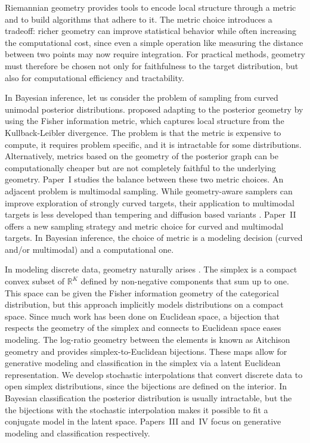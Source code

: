 Riemannian geometry \citep{do1992riemannian,Lee2018} provides tools to encode local structure through a metric and to build algorithms that adhere to it. The metric choice introduces a tradeoff: richer geometry can improve statistical behavior while often increasing the computational cost, since even a simple operation like measuring the distance between two points may now require integration. For practical methods, geometry must therefore be chosen not only for faithfulness to the target distribution, but also for computational efficiency and tractability. 

In Bayesian inference, let us consider the problem of sampling from curved unimodal posterior distributions. \citet{Girolami2011} proposed adapting to the posterior geometry by using the Fisher information metric, which captures local structure from the Kullback-Leibler divergence. The problem is that the metric is expensive to compute, it requires problem specific, and it is intractable for some distributions. Alternatively, metrics based on the geometry of the posterior graph \citep{Hartmann2022, hartmann:2023} can be computationally cheaper but are not completely faithful to the underlying geometry. Paper~I studies the balance between these two metric choices. An adjacent problem is multimodal sampling. While geometry-aware samplers can improve exploration of strongly curved targets, their application to multimodal targets is less developed than tempering and diffusion based variants \citep{Lan2014, Latuszynski2025}. Paper~II offers a new sampling strategy and metric choice for curved and multimodal targets. In Bayesian inference, the choice of metric is a modeling decision (curved and/or multimodal) and a computational one. 

In modeling discrete data, geometry naturally arises \citep{fisher1925theory, Aitchison1986}. The simplex is a compact convex subset of $\mathbb{R}^{K}$  defined by non-negative components that sum up to one. This space can be given the Fisher information geometry of the categorical distribution, but this approach implicitly models distributions on a compact space. Since much work has been done on Euclidean space, a bijection that respects the geometry of the simplex and connects to Euclidean space eases modeling. The log-ratio geometry between the elements is known as Aitchison geometry and provides simplex-to-Euclidean bijections. These maps allow for generative modeling and classification in the simplex via a latent Euclidean representation. We develop stochastic interpolations that convert discrete data to open simplex distributions, since the bijections are defined on the interior. In Bayesian classification the posterior distribution is usually intractable, but the the bijections with the stochastic interpolation makes it possible to fit a conjugate model in the latent space. Papers~III and~IV focus on generative modeling and classification respectively. 

